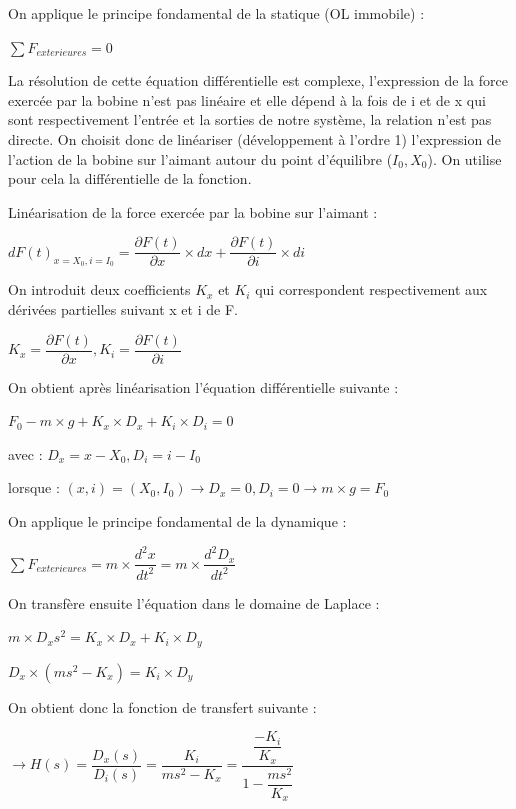 \documentclass[11pt, french]{article} %
\begin{document}
\medskip
\noindent
On applique le principe fondamental de la statique (OL immobile) :

 \medskip
$ \sum F_{exterieures}  = 0 $
 \medskip

La résolution de cette équation différentielle est complexe, l'expression de la force exercée par la bobine n'est pas linéaire et elle dépend à la fois de i et de x qui sont respectivement l'entrée et la sorties de notre système, la relation n'est pas directe. On choisit donc de linéariser (développement à l'ordre 1) l'expression de l'action de la bobine sur l'aimant autour du point d'équilibre ($I_0, X_0 $). On utilise pour cela la différentielle de la fonction.

\medskip
\noindent
Linéarisation de la force exercée par la bobine sur l'aimant :

 \medskip
$ {dF(t)}_{x = X_0, i = I_0} = \dfrac{\partial F(t)}{\partial x} \times dx + \dfrac{\partial F(t)}{\partial i} \times di $
 \medskip

\noindent
On introduit deux coefficients $ K_x $ et $ K_i $ qui correspondent respectivement aux dérivées partielles suivant x et i de F.

 \medskip
$ K_x = \dfrac{\partial F(t)}{\partial x}, K_i = \dfrac{\partial F(t)}{\partial i} $
 \medskip

\noindent
On obtient après linéarisation l'équation différentielle suivante :

 \medskip
$ F_0 - m \times g + K_x \times D_x + K_i \times D_i = 0 $
 \medskip

avec : $ D_x = x - X_0, D_i = i - I_0 $

lorsque : $ (x, i) = (X_0, I_0) \rightarrow D_x = 0, D_i = 0 \rightarrow m \times g = F_0 $

\medskip
\noindent
On applique le principe fondamental de la dynamique :

 \medskip
$ \sum F_{exterieures}  = m \times \dfrac{d^2x}{dt^2} = m \times \dfrac{d^2D_x}{dt^2} $
 \medskip

\noindent
On transfère ensuite l'équation dans le domaine de Laplace :

 \medskip
$ m \times D_x{s^2} = K_x \times D_x + K_i \times D_y $

$ D_x \times (m{s^2} - K_x) = K_i \times D_y $
 \medskip

\noindent
On obtient donc la fonction de transfert suivante :

 \medskip
$ \rightarrow H(s) = \dfrac{D_x(s)}{D_i(s)} = \dfrac{K_i}{m{s^2}- K_x}  = \dfrac{\dfrac{-K_i}{K_x}}{1 - \dfrac{m{s^2}}{K_x}} $
 \medskip
\end{document}
